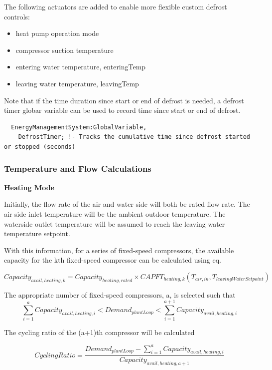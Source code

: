 The following actuators are added to enable more flexible custom defrost controls:
\begin{itemize}
  \item heat pump operation mode
  \item compressor suction temperature
  \item entering water temperature, enteringTemp
  \item leaving water temperature, leavingTemp
\end{itemize}
Note that if the time duration since start or end of defrost is needed, a
defrost timer globar variable can be used to record time since start or end of
defrost.
\begin{verbatim}
  EnergyManagementSystem:GlobalVariable,
    DefrostTimer; !- Tracks the cumulative time since defrost started or stopped (seconds)
\end{verbatim}

\subsubsection{Temperature and Flow Calculations}
\noindent\textbf{Heating Mode}

Initially, the flow rate of the air and water side will both be rated flow rate.
The air side inlet temperature will be the ambient outdoor temperature. The
waterside outlet temperature will be assumed to reach the leaving water
temperature setpoint.

With this information, for a series of fixed-speed compressors, the available
capacity for the kth fixed-speed compressor can be calculated using eq.

\begin{equation}
Capacity_{avail,heating,k}=Capacity_{heating,rated} \times CAPFT_{heating,k}(T_{air,in},T_{leavingWaterSetpoint})
\end{equation}

The appropriate number of fixed-speed compressors, a, is selected such that
\begin{equation}
\sum_{i=1}^{a} Capacity_{avail,heating,i} < Demand_{plantLoop} < \sum_{i=1}^{a+1} Capacity_{avail,heating,i}
\end{equation}

The cycling ratio of the (a+1)th compressor will be calculated

\begin{equation}
CyclingRatio = \frac{Demand_{plantLoop} - \sum_{i=1}^{a} Capacity_{avail,heating,i}}{Capacity_{avail,heating,a+1}}
\end{equation}

